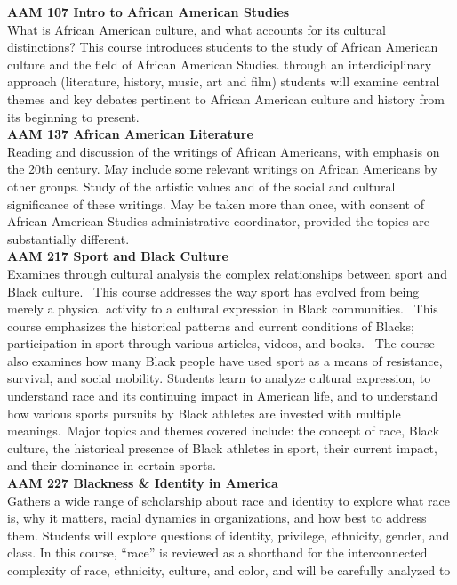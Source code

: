 \documentclass[
  letterpaper,
]{scrbook}
\begin{document}
\textbf{AAM 107 Intro to African American Studies}\\
What is African American culture, and what accounts for its cultural
distinctions? This course introduces students to the study of African
American culture and the field of African American Studies. through an
interdiciplinary approach (literature, history, music, art and film)
students will examine central themes and key debates pertinent to
African American culture and history from its beginning to present.\\
\textbf{AAM 137 African American Literature}\\
Reading and discussion of the writings of African Americans, with
emphasis on the 20th century. May include some relevant writings on
African Americans by other groups. Study of the artistic values and of
the social and cultural significance of these writings. May be taken
more than once, with consent of African American Studies administrative
coordinator, provided the topics are substantially different.\\
\textbf{AAM 217 Sport and Black Culture}\\
Examines through cultural analysis the complex relationships between
sport and Black culture.~ This course addresses the way sport has
evolved from being merely a physical activity to a cultural expression
in Black communities.~ This course emphasizes the historical patterns
and current conditions of Blacks; participation in sport through various
articles, videos, and books.~ The course also examines how many Black
people have used sport as a means of resistance, survival, and social
mobility. Students learn to analyze cultural expression, to understand
race and its continuing impact in American life, and to understand how
various sports pursuits by Black athletes are invested with multiple
meanings.~Major topics and themes covered include: the concept of race,
Black culture, the historical presence of Black athletes in sport, their
current impact, and their dominance in certain sports.\\
\textbf{AAM 227 Blackness \& Identity in America}\\
Gathers a wide range of scholarship about race and identity to explore
what race is, why it matters, racial dynamics in organizations, and how
best to address them. Students will explore questions of identity,
privilege, ethnicity, gender, and class. In this course, ``race'' is
reviewed as a shorthand for the interconnected complexity of race,
ethnicity, culture, and color, and will be carefully analyzed to
\end{document}
